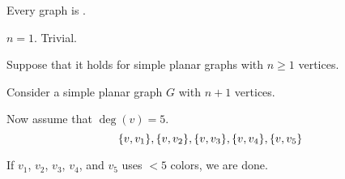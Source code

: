 
\begin{frame}{}
  \begin{theorem}
    Every   graph is .
  \end{theorem}

  \pause
  \vspace{0.30cm}
  \begin{center}

    \pause
    \vspace{0.30cm}
    \begin{description}
      \setlength{\itemsep}{6pt}
      \item[Basis Step:] $n = 1$. Trivial.
      \item[Induction Hypothesis:]
        Suppose that it holds for simple planar graphs with $n \ge 1$ vertices.
      \item[Induction Step:]
        Consider a simple planar graph $G$ with $n+1$ vertices. \\[5pt]
    \end{description}
  \end{center}
\end{frame}

\begin{frame}{}
  \begin{center}
    Now assume that $\deg(v) = 5$. \\[5pt]
    \[
      \{v, v_{1}\}, \{v, v_{2}\}, \{v, v_{3}\}, \{v, v_{4}\}, \{v, v_{5}\}
    \]

    \pause
    \vspace{0.30cm}
    If $v_{1}$, $v_{2}$, $v_{3}$, $v_{4}$, and $v_{5}$ uses $< 5$ colors,
    we are done.
  \end{center}
\end{frame}

